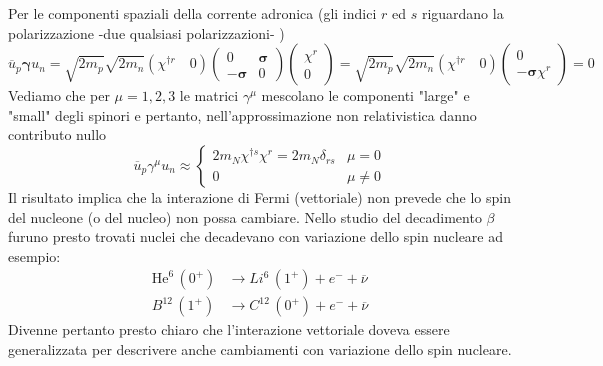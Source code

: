 Per le componenti spaziali della corrente adronica (gli indici $r$ ed $s$ riguardano la polarizzazione -due qualsiasi polarizzazioni- )
$$
\overline{u}_p \boldsymbol{\gamma} u_n = \sqrt{2m_p}\sqrt{2m_n} (\chi^{\dagger r} \quad 0) \begin{pmatrix} 0 & \boldsymbol{\sigma} \\ -\boldsymbol{\sigma} & 0 \end{pmatrix} \begin{pmatrix} \chi^r \\ 0 \end{pmatrix} = \sqrt{2m_p}\sqrt{2m_n} (\chi^{\dagger r} \quad 0) \begin{pmatrix} 0 \\ -\boldsymbol{\sigma}\chi^r \end{pmatrix} = 0
$$
Vediamo che per $\mu=1,2,3$ le matrici $\gamma^\mu$ mescolano le componenti "large" e "small" degli spinori e pertanto, nell'approssimazione non relativistica danno contributo nullo
$$
\overline{u}_p \gamma^\mu u_n \approx \begin{cases} 2m_N \chi^{\dagger s} \chi^r = 2m_N \delta_{rs} & \mu = 0 \\ 0 & \mu \neq 0 \end{cases}
$$
Il risultato implica che la interazione di Fermi (vettoriale) non prevede che lo spin del nucleone (o del nucleo) non possa cambiare. Nello studio del decadimento $\beta$ furuno presto trovati nuclei che decadevano con variazione dello spin nucleare ad esempio:
$$
\begin{aligned}
\text{He}^6 \, (0^+) &\to Li^6 \, (1^+) + e^- + \overline{\nu} \\
B^{12} \, (1^+) &\to C^{12} \, (0^+) + e^- + \overline{\nu}
\end{aligned}
$$
Divenne pertanto presto chiaro che l'interazione vettoriale doveva essere generalizzata per descrivere anche cambiamenti con variazione dello spin nucleare.
